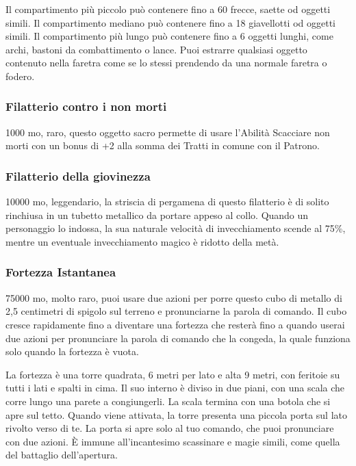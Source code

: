 \begin{multicols}{2}
Il compartimento più piccolo può contenere fino a 60 frecce, saette od oggetti simili. Il compartimento mediano può contenere fino a 18 giavellotti od oggetti simili. Il compartimento più lungo può contenere fino a 6 oggetti lunghi, come archi, bastoni da combattimento o lance. Puoi estrarre qualsiasi oggetto contenuto nella faretra come se lo stessi prendendo da una normale faretra o fodero.

\subsubsection*{Filatterio contro i non morti}
1000 mo, raro, questo oggetto sacro permette di usare l'Abilità Scacciare non morti con un bonus di +2 alla somma dei Tratti in comune con il Patrono.

\subsubsection*{Filatterio della giovinezza}
10000 mo, leggendario, la striscia di pergamena di questo filatterio è di solito rinchiusa in un tubetto metallico da portare appeso al collo. Quando un personaggio lo indossa, la sua naturale velocità di invecchiamento scende al 75\%, mentre un eventuale invecchiamento magico è ridotto della metà.

\subsubsection*{Fortezza Istantanea}
75000 mo, molto raro, puoi usare due azioni per porre questo cubo di metallo di 2,5 centimetri di spigolo sul terreno e pronunciarne la parola di comando. Il cubo cresce rapidamente fino a diventare una fortezza che resterà fino a quando userai due azioni per pronunciare la parola di comando che la congeda, la quale funziona solo quando la fortezza è vuota.

La fortezza è una torre quadrata, 6 metri per lato e alta 9 metri, con feritoie su tutti i lati e spalti in cima. Il suo interno è diviso in due piani, con una scala che corre lungo una parete a congiungerli. La scala termina con una botola che si apre sul tetto. Quando viene attivata, la torre presenta una piccola porta sul lato rivolto verso di te. La porta si apre solo al tuo comando, che puoi pronunciare con due azioni. È immune all'incantesimo scassinare e magie simili, come quella del battaglio dell'apertura.


\end{multicols}
